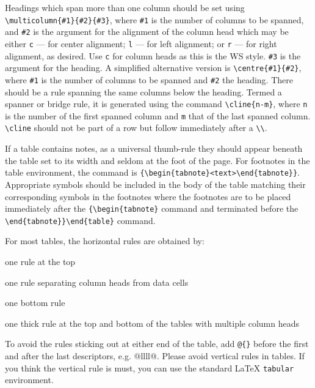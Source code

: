 Headings which span more than one column should be set using
\verb|\multicolumn{#1}{#2}{#3}|, where \verb|#1| is the number of
columns to be spanned, and \verb|#2| is the argument for the alignment
of the column head which may be either \verb|c| --- for center
alignment; \verb|l| --- for left alignment; or \verb|r| --- for right
alignment, as desired. Use \verb|c| for column heads as
this is the WS style. \verb|#3| is the argument for the heading. A simplified
alternative version is \verb|\centre{#1}{#2}|, where \verb|#1| is
the number of columns to be spanned and \verb|#2| the heading.
There should be a rule spanning the same columns below the
heading. Termed a spanner or bridge rule, it is generated using
the command \verb|\cline{n-m}|, where \verb|n| is the number of the
first spanned column and \verb|m| that of the last spanned column.
\verb|\cline| should not be part of a row but follow immediately
after a \verb|\\|.

If a table contains notes, as a
universal thumb-rule they should appear beneath the table set to its
width and seldom at the foot of the page. For footnotes in the
table environment, the command is
\verb|{\begin{tabnote}<text>\end{tabnote}}|. Appropriate symbols
should be included in the body of the table matching their
corresponding symbols in the footnotes where the footnotes are to be
placed immediately after the \verb|{\begin{tabnote}| command and
terminated before the \verb|\end{tabnote}}\end{table}| command.

\newpage

For most tables, the horizontal rules are obtained by:

\begin{description}
\item[toprule] one rule at the top
\item[colrule] one rule separating column heads from data cells
\item[botrule] one bottom rule
\item[Hline] one thick rule at the top and bottom of the tables with multiple column heads
\end{description}

To avoid the rules sticking out at either end of the table, add
\verb|@{}| before the first and after the last descriptors, e.g.
{@{}llll@{}}. Please avoid vertical rules in tables. If you
think the vertical rule is must, you can use the standard \LaTeX{}
\verb|tabular| environment.

